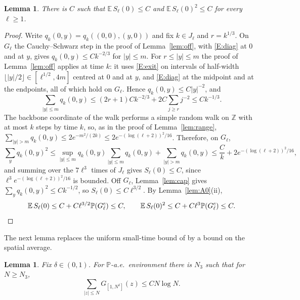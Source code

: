 \documentclass[11pt]{amsart}
\newtheorem{lemma}[theorem]{Lemma}
\theoremstyle{remark}
\numberwithin{equation}{section}
\newcommand{\PP}{\mathbb{P}}
\newcommand{\EE}{\mathbb{E}}
\newcommand{\Z}{\mathbb{Z}}
\begin{document}
\begin{lemma}\label{lem:A}
There is $C$ such that $\EE\,S_\ell(0)\le C$ and $\EE\,S_\ell(0)^2\le C$ for every $\ell\ge1$.
\end{lemma}

\begin{proof}
Write $q_k(0,y)=q_k((0,0),(y,0))$ and fix $k\in J_\ell$ and $r=k^{1/3}$. On $G_\ell$ the Cauchy--Schwarz step in the proof of Lemma~\ref{lem:off}, with \ref{E:diag} at $0$ and at $y$, gives $q_k(0,y)\le Ck^{-2/3}$ for $|y|\le m$. For $r\le|y|\le m$ the proof of Lemma~\ref{lem:off} applies at time $k$: it uses \ref{E:exit} on intervals of half-width $\lfloor|y|/2\rfloor\in[\ell^{1/2},4m]$ centred at $0$ and at $y$, and \ref{E:diag} at the midpoint and at the endpoints, all of which hold on $G_\ell$. Hence $q_k(0,y)\le C|y|^{-2}$, and
\[
\sum_{|y|\le m}q_k(0,y)\le(2r+1)Ck^{-2/3}+2C\sum_{j\ge r}j^{-2}\le Ck^{-1/3}.
\]
The backbone coordinate of the walk performs a simple random walk on $\Z$ with at most $k$ steps by time $k$, so, as in the proof of Lemma~\ref{lem:range}, $\sum_{|y|>m}q_k(0,y)\le2e^{-m^2/(2k)}\le2e^{-(\log(\ell+2))^2/16}$. Therefore, on $G_\ell$,
\[
\sum_yq_k(0,y)^2\le\sup_{|y|\le m}q_k(0,y)\sum_{|y|\le m}q_k(0,y)+\sum_{|y|>m}q_k(0,y)\le\frac Ck+2e^{-(\log(\ell+2))^2/16},
\]
and summing over the $7\ell^3$ times of $J_\ell$ gives $S_\ell(0)\le C$, since $\ell^3e^{-(\log(\ell+2))^2/16}$ is bounded. Off $G_\ell$, Lemma~\ref{lem:cap} gives $\sum_yq_k(0,y)^2\le Ck^{-1/2}$, so $S_\ell(0)\le C\ell^{3/2}$. By Lemma~\ref{lem:A0}(ii),
\[
\EE\,S_\ell(0)\le C+C\ell^{3/2}\PP(G_\ell^c)\le C,\qquad \EE\,S_\ell(0)^2\le C+C\ell^3\PP(G_\ell^c)\le C. \qedhere
\]
\end{proof}

The next lemma replaces the uniform small-time bound of \cite{DNNS} by a bound on the spatial average.

\begin{lemma}\label{lem:small}
Fix $\delta\in(0,1)$. For $\PP$-a.e.\ environment there is $N_3$ such that for $N\ge N_3$,
\[
\sum_{|z|\le N}G_{[1,N^\delta]}(z)\le CN\log N .
\]
\end{lemma}
\end{document}
